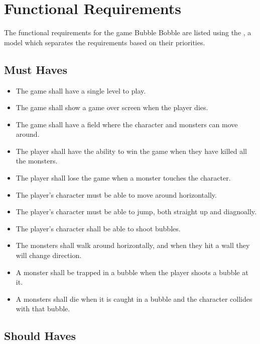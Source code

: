 \chapter{Functional Requirements}

The functional requirements for the game Bubble Bobble are listed using the , a model which separates the requirements based on their priorities.

\section{Must Haves}

\begin{itemize}
\itemsep0em 
  	\item The game shall have a single level to play.
  	\item The game shall show a game over screen when the player dies.
 	\item The game shall have a field where the character and monsters can move around.
  	\item The player shall have the ability to win the game when they have killed all the monsters.
 	\item The player shall lose the game when a monster touches the character.
  	\item The player's character must be able to move around horizontally.
  	\item The player's character must be able to jump, both straight up and diagnoally.
  	\item The player's character shall be able to shoot bubbles.
  	\item The monsters shall walk around horizontally, and when they hit a wall they will change direction. 
 	\item A monster shall be trapped in a bubble when the player shoots a bubble at it.
 	\item A monsters shall die when it is caught in a bubble and the character collides with that bubble.
\end{itemize}

\section{Should Haves}

